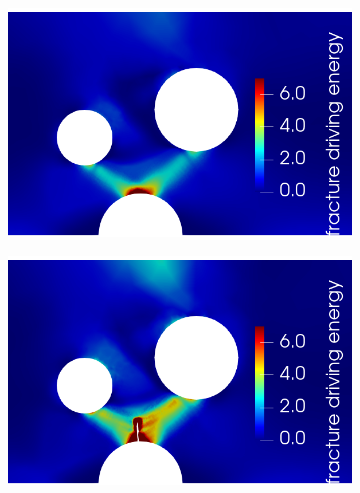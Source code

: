 
\begin{figure}[!htb]
    \centering
    \begin{subfigure}{0.23\textwidth}
        \includegraphics[width=\textwidth,scale=0.5]{prelim/figures/model_1_total_1.png}
        \caption{}
    \end{subfigure}
    \hspace{0.05\textwidth}
    \begin{subfigure}{0.23\textwidth}
        \includegraphics[width=\textwidth,scale=0.5]{prelim/figures/model_1_total_2.png}
        \caption{}
    \end{subfigure}
    \hspace{0.05\textwidth}
    \begin{subfigure}{0.23\textwidth}

\end{subfigure}
\end{figure}
